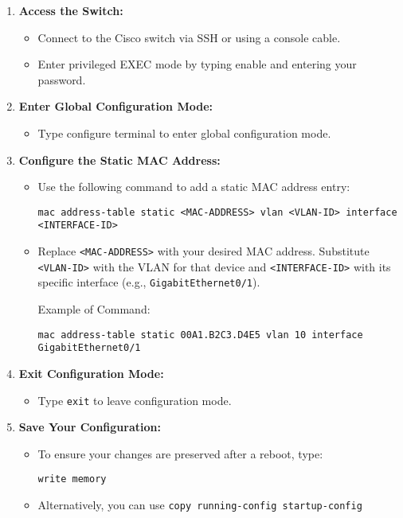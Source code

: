 \documentclass[11pt,a4paper]{article}
\begin{document}
\begin{enumerate}
    \item \textbf{Access the Switch:}
        \begin{itemize}
            \item Connect to the Cisco switch via SSH or using a console cable.
            \item Enter privileged EXEC mode by typing enable and entering your password.
        \end{itemize}
    \item \textbf{Enter Global Configuration Mode:}
        \begin{itemize}
            \item Type configure terminal to enter global configuration mode.
        \end{itemize}
    \item \textbf{Configure the Static MAC Address:}
        \begin{itemize}
            \item Use the following command to add a static MAC address entry:

\begin{lstlisting}
mac address-table static <MAC-ADDRESS> vlan <VLAN-ID> interface <INTERFACE-ID>
\end{lstlisting}

            \item Replace \lstinline{<MAC-ADDRESS>} with your desired MAC address. Substitute \lstinline{<VLAN-ID>} with the VLAN for that device and \lstinline{<INTERFACE-ID>} with its specific interface (e.g., \lstinline{GigabitEthernet0/1}).
            
            Example of Command:

\begin{lstlisting}
mac address-table static 00A1.B2C3.D4E5 vlan 10 interface GigabitEthernet0/1
\end{lstlisting}
\end{itemize}
    \item \textbf{Exit Configuration Mode:}
        \begin{itemize}
            \item Type \lstinline{exit} to leave configuration mode.

        \end{itemize}

    \item \textbf{Save Your Configuration:}
        \begin{itemize}
            \item To ensure your changes are preserved after a reboot, type:
\begin{lstlisting}
write memory
\end{lstlisting}

            \item Alternatively, you can use \lstinline{copy running-config startup-config}
\end{itemize}

\end{enumerate}
\end{document}
